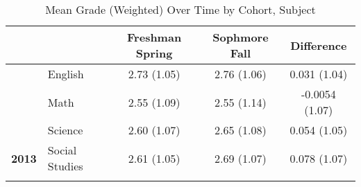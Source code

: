 \begin{table}[!h]

\caption{\label{tab:table_grade_desc}Mean Grade (Weighted) Over Time by Cohort, Subject}
\centering
\begin{tabular}[t]{>{}llccc}
\toprule{}
 &  & Freshman Spring & Sophmore Fall & Difference\\
\midrule{}
 & English & 2.73 (1.05) & 2.76 (1.06) & 0.031 (1.04)\\

 & Math & 2.55 (1.09) & 2.55 (1.14) & -0.0054 (1.07)\\

 & Science & 2.60 (1.07) & 2.65 (1.08) & 0.054 (1.05)\\

\multirow{-4}{*}{\raggedright\arraybackslash \textbf{2013}} & Social Studies & 2.61 (1.05) & 2.69 (1.07) & 0.078 (1.07)\\
\bottomrule{}
\end{tabular}
\end{table}

